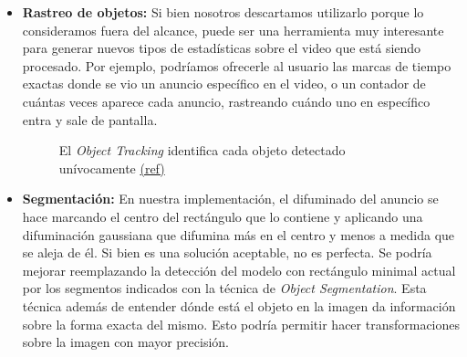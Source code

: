 \documentclass[a4paper]{article}
\begin{document}
\begin{itemize}
\item \textbf{Rastreo de objetos:} Si bien nosotros descartamos utilizarlo porque lo consideramos fuera del alcance, puede ser una herramienta muy interesante para generar nuevos tipos de estadísticas sobre el video que está siendo procesado. Por ejemplo, podríamos ofrecerle al usuario las marcas de tiempo exactas donde se vio un anuncio específico en el video, o un contador de cuántas veces aparece cada anuncio, rastreando cuándo uno en específico entra y sale de pantalla.


\begin{figure}[H]
\caption{El \textit{Object Tracking} identifica cada objeto detectado unívocamente \scriptsize{\href{https://viso.ai/deep-learning/object-tracking/}{(ref)}}}
\end{figure}

\item \textbf{Segmentación:} En nuestra implementación, el difuminado del anuncio se hace marcando el centro del rectángulo que lo contiene y aplicando una difuminación gaussiana que difumina más en el centro y menos a medida que se aleja de él. Si bien es una solución aceptable, no es perfecta. Se podría mejorar reemplazando la detección del modelo con rectángulo minimal actual por los segmentos indicados con la técnica de \textit{Object Segmentation}. Esta técnica además de entender dónde está el objeto en la imagen da información sobre la forma exacta del mismo. Esto podría permitir hacer transformaciones sobre la imagen con mayor precisión.


\end{itemize}
\end{document}
